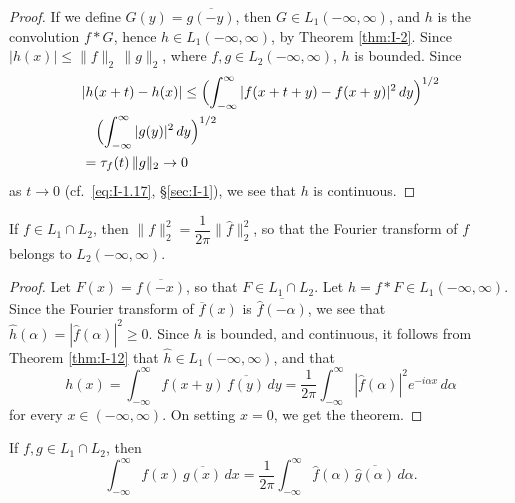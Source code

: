 \begin{proof}
If we define $G(y)=\overline{g(-y)}$, then $G\in L_1(-\infty,\infty)$, and $h$ is the convolution $f*G$, hence $h\in L_1(-\infty,\infty)$, by Theorem \ref{thm:I-2}. Since $|h(x)|\le\|f\|_2\,\|g\|_2$, where $f,g\in L_2(-\infty,\infty)$, $h$ is bounded. Since
\begin{equation*}
\begin{aligned}
&|h(x+t) - h(x)| \le \Bigl(\int_{-\infty}^{\infty}|f(x+t+y)-f(x+y)|^{2}\,dy\Bigr)^{1/2}\\
&\quad \Bigl(\int_{-\infty}^{\infty}|g(y)|^{2}\,dy\Bigr)^{1/2}\\
&= \tau_f(t)\,\|g\|_2\to 0
\end{aligned}
\end{equation*}
as $t\to 0$ (cf.\ \eqref{eq:I-1.17}, \S\ref{sec:I-1}), we see that $h$ is continuous.
\end{proof}

\begin{theorem}\label{thm:I-13}
If $f\in L_1\cap L_2$, then $\|f\|_2^{2}=\dfrac{1}{2\pi}\|\widehat f\|_2^{2}$, so that the Fourier transform of $f$ belongs to $L_2(-\infty,\infty)$.
\end{theorem}

\begin{proof}
Let $F(x)=\overline{f(-x)}$, so that $F\in L_1\cap L_2$. Let $h=f*F\in L_1(-\infty,\infty)$. Since the Fourier transform of $\overline f(x)$ is $\overline{\widehat f(-\alpha)}$, we see that $\hat h(\alpha)=|\widehat f(\alpha)|^{2}\ge 0$. Since $h$ is bounded, and continuous, it follows from Theorem \ref{thm:I-12} that $\hat h\in L_1(-\infty,\infty)$, and that
\begin{equation*}
h(x)=\int_{-\infty}^{\infty}f(x+y)\,\overline{f(y)}\,dy
=\frac{1}{2\pi}\int_{-\infty}^{\infty}|\widehat f(\alpha)|^{2}e^{-i\alpha x}\,d\alpha
\end{equation*}
for every $x\in(-\infty,\infty)$. On setting $x=0$, we get the theorem.
\end{proof}

\begin{theorem}\label{thm:I-14}
If $f,g\in L_1\cap L_2$, then
\begin{equation*}
\int_{-\infty}^{\infty}f(x)\,\overline{g(x)}\,dx
=\frac{1}{2\pi}\int_{-\infty}^{\infty}\widehat f(\alpha)\,\overline{\widehat g(\alpha)}\,d\alpha.
\end{equation*}
\end{theorem}

